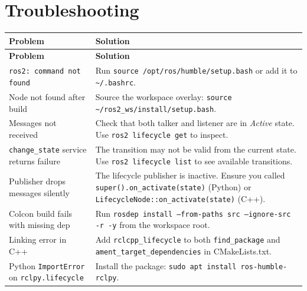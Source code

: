 \documentclass[12pt,a4paper]{article}
\newcommand{\code}[1]{\texttt{#1}}
\begin{document}
\section{Troubleshooting}
\label{app:troubleshoot}

\begin{longtable}{p{4.5cm}p{8.5cm}}
  \toprule
  \textbf{Problem} & \textbf{Solution} \\
  \midrule
  \endfirsthead
  \toprule
  \textbf{Problem} & \textbf{Solution} \\
  \midrule
  \endhead
  \code{ros2: command not found} &
  Run \code{source /opt/ros/humble/setup.bash} or add it to
  \code{\textasciitilde/.bashrc}. \\[4pt]

  Node not found after build &
  Source the workspace overlay:
  \code{source \textasciitilde/ros2\_ws/install/setup.bash}. \\[4pt]

  Messages not received &
  Check that both talker and listener are in \emph{Active} state.
  Use \code{ros2 lifecycle get} to inspect. \\[4pt]

  \code{change\_state} service returns failure &
  The transition may not be valid from the current state.
  Use \code{ros2 lifecycle list} to see available transitions. \\[4pt]

  Publisher drops messages silently &
  The lifecycle publisher is inactive.  Ensure you called
  \code{super().on\_activate(state)} (Python) or
  \code{LifecycleNode::on\_activate(state)} (C++). \\[4pt]

  Colcon build fails with missing dep &
  Run \code{rosdep install --from-paths src --ignore-src -r -y}
  from the workspace root. \\[4pt]

  Linking error in C++ &
  Add \code{rclcpp\_lifecycle} to both
  \code{find\_package} and \code{ament\_target\_dependencies}
  in CMakeLists.txt. \\[4pt]

  Python \code{ImportError} on \code{rclpy.lifecycle} &
  Install the package: \code{sudo apt install
  ros-humble-rclpy}. \\

  \bottomrule
\end{longtable}

\end{document}
